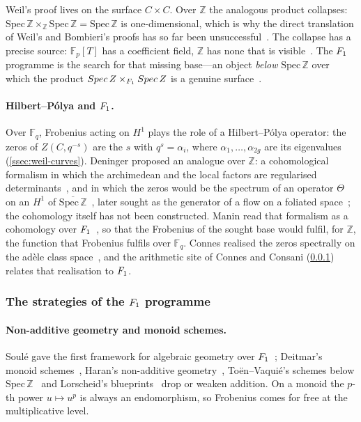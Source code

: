 Weil's proof lives on the surface $C\times C$.  Over $\mathbb{Z}$ the analogous
product collapses: $\mathrm{Spec}\,\mathbb{Z}\times_{\mathbb{Z}}\mathrm{Spec}\,\mathbb{Z}
=\mathrm{Spec}\,\mathbb{Z}$ is one-dimensional, which is why the direct
translation of Weil's and Bombieri's proofs has so far been
unsuccessful~\cite{vanfrankenhuijsen08}.  The collapse has a precise source:
$\mathbb{F}_p[T]$ has a coefficient field, $\mathbb{Z}$ has none that is
visible~\cite{kurokawa03}.  The $F_1$ programme is the search for that missing
base---an object \emph{below} $\mathrm{Spec}\,\mathbb{Z}$ over which the product
$Spec\,Z\times_{F_1}Spec\,Z$ is a genuine
surface~\cite{haran07,toen09}.

\paragraph{Hilbert--P\'olya and $F_1$.}
Over $\mathbb{F}_q$, Frobenius acting on $H^1$ plays the role of a
Hilbert--P\'olya operator: the zeros of $Z(C,q^{-s})$ are the $s$ with
$q^{s}=\alpha_i$, where $\alpha_1,\dots,\alpha_{2g}$ are its eigenvalues
(\cref{ssec:weil-curves}).  Deninger proposed an analogue over $\mathbb{Z}$: a
cohomological formalism in which the archimedean and the local factors are
regularised determinants~\cite{deninger91,deninger92}, and in which the zeros
would be the spectrum of an operator $\Theta$ on an $H^1$ of
$\overline{\mathrm{Spec}\,\mathbb{Z}}$~\cite{deninger94}, later sought as the
generator of a flow on a foliated space~\cite{deninger98}; the cohomology itself
has not been constructed.  Manin read that formalism as a cohomology over
$F_1$~\cite{manin95}, so that the Frobenius of the sought base would fulfil, for
$\mathbb{Z}$, the function that Frobenius fulfils over $\mathbb{F}_q$.  Connes
realised the zeros spectrally on the ad\`ele class space~\cite{connes99}, and the
arithmetic site of Connes and Consani (\cref{ssec:f1-strategies}) relates that
realisation to $F_1$.

\subsubsection{The strategies of the $F_1$ programme}\label{ssec:f1-strategies}

\paragraph{Non-additive geometry and monoid schemes.}
Soul\'e gave the first framework for algebraic geometry over $F_1$~\cite{soule03};
Deitmar's monoid schemes~\cite{deitmar05}, Haran's non-additive
geometry~\cite{haran07}, To\"en--Vaqui\'e's schemes below
$\mathrm{Spec}\,\mathbb{Z}$~\cite{toen09} and Lorscheid's
blueprints~\cite{lorscheid12blueprints} drop or weaken addition.  On a monoid
the $p$-th power $u\mapsto u^p$ is always an endomorphism, so Frobenius comes
for free at the multiplicative level.


